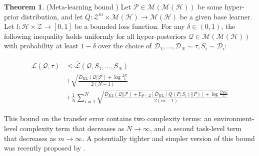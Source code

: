 \documentclass{article}
\theoremstyle{definition}
\newtheorem{theorem}{Theorem}[section]
\newcommand{\Expect}[2]{\mathbb{E}_{#1}\left [#2 \right ]}
\begin{document}
\begin{theorem} (Meta-learning bound \citep{Amit2018}) \label{thm:meta-pb}
	Let $\mathcal{P}\in \mathcal{M}(\mathcal{M}(\mathcal{H}))$ be some hyper-prior distribution, and let $Q: \mathcal{Z}^m\times\mathcal{M}(\mathcal{H})\rightarrow \mathcal{M}(\mathcal{H})$ be a given base learner. Let $l: \mathcal{H}\times \mathcal{Z}\rightarrow [0, 1]$ be a bounded loss function.
	For any $\delta \in (0,1)$, the following inequality holds uniformly for all hyper-posteriors $\mathcal{Q}\in \mathcal{M}(\mathcal{M}(\mathcal{H}))$ with probability at least $1-\delta$ over the choice of $\mathcal{D}_1,...,\mathcal{D}_N\sim \tau, S_i\sim \mathcal{D}_i$:
	
	\begin{align} \label{eq:meta-pb-amit}
	\begin{split}
	\mathcal{L}(\mathcal{Q}, \tau) &\leq \hat{\mathcal{L}}(\mathcal{Q}, S_1,...,S_N) \\
	&+\sqrt{\frac{D_{KL}(\mathcal{Q}||\mathcal{P})+\log\frac{2N}{\delta}}{2(N-1)}} \\
	&+\frac{1}{N}\sum_{i=1}^{N}\sqrt{\frac{D_{KL}(\mathcal{Q}||\mathcal{P})+\Expect{P\sim \mathcal{Q}}{D_{KL}(Q(P,S_i)||P)}+\log\frac{2Nm}{\delta}}{2(m-1)}}
	\end{split}
	\end{align}
	
\end{theorem}

This bound on the transfer error contains two complexity terms: an environment-level complexity term that decreases as $N\rightarrow \infty$, and a second task-level term that decreases as $m\rightarrow \infty$. A potentially tighter and simpler version of this bound was recently proposed by \cite{Rothfuss2020}.
\end{document}
